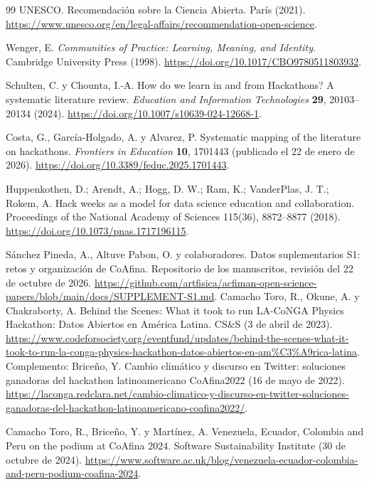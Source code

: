 \begin{thebibliography}{99}\small\setlength{\itemsep}{1pt}\setlength{\parskip}{0pt}
 UNESCO. Recomendación sobre la Ciencia Abierta. París (2021). \url{https://www.unesco.org/en/legal-affairs/recommendation-open-science}.

 Wenger, E. \emph{Communities of Practice: Learning, Meaning, and Identity}. Cambridge University Press (1998). \url{https://doi.org/10.1017/CBO9780511803932}.

 Schulten, C. y Chounta, I.-A. How do we learn in and from Hackathons? A systematic literature review. \emph{Education and Information Technologies} \textbf{29}, 20103--20134 (2024). \url{https://doi.org/10.1007/s10639-024-12668-1}.

 Costa, G., García-Holgado, A. y Alvarez, P. Systematic mapping of the literature on hackathons. \emph{Frontiers in Education} \textbf{10}, 1701443 (publicado el 22 de enero de 2026). \url{https://doi.org/10.3389/feduc.2025.1701443}.

 Huppenkothen, D.; Arendt, A.; Hogg, D. W.; Ram, K.; VanderPlas, J. T.; Rokem, A. Hack weeks as a model for data science education and collaboration. Proceedings of the National Academy of Sciences 115(36), 8872--8877 (2018). \url{https://doi.org/10.1073/pnas.1717196115}.

 Sánchez Pineda, A., Altuve Pabon, O. y colaboradores. Datos suplementarios S1: retos y organización de CoAfina. Repositorio de los manuscritos, revisión del 22 de octubre de 2026. \url{https://github.com/artfisica/acfiman-open-science-papers/blob/main/docs/SUPPLEMENT-S1.md}.
 Camacho Toro, R., Okune, A. y Chakraborty, A. Behind the Scenes: What it took to run LA-CoNGA Physics Hackathon: Datos Abiertos en América Latina. CS\&S (3 de abril de 2023). \url{https://www.codeforsociety.org/eventfund/updates/behind-the-scenes-what-it-took-to-run-la-conga-physics-hackathon-datos-abiertos-en-am%C3%A9rica-latina}. Complemento: Briceño, Y. Cambio climático y discurso en Twitter: soluciones ganadoras del hackathon latinoamericano CoAfina2022 (16 de mayo de 2022). \url{https://laconga.redclara.net/cambio-climatico-y-discurso-en-twitter-soluciones-ganadoras-del-hackathon-latinoamericano-coafina2022/}.

 Camacho Toro, R., Briceño, Y. y Martínez, A. Venezuela, Ecuador, Colombia and Peru on the podium at CoAfina 2024. Software Sustainability Institute (30 de octubre de 2024). \url{https://www.software.ac.uk/blog/venezuela-ecuador-colombia-and-peru-podium-coafina-2024}.


\end{thebibliography}
